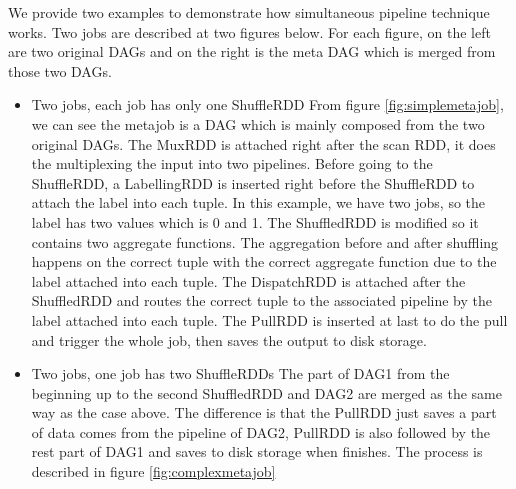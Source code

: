 We provide two examples to demonstrate how simultaneous pipeline technique works. Two jobs are described at two figures below. For each figure, on the left are two original DAGs and on the right is the meta DAG which is merged from those two DAGs.
\begin{itemize}
\item Two jobs, each job has only one ShuffleRDD
From figure \ref{fig:simplemetajob}, we can see the metajob is a DAG which is mainly composed from the two original DAGs. The MuxRDD is attached right after the scan RDD, it does the multiplexing the input into two pipelines. Before going to the ShuffleRDD, a LabellingRDD is inserted right before the ShuffleRDD to attach the label into each tuple. In this example, we have two jobs, so the label has two values which is 0 and 1. The ShuffledRDD is modified so it contains two aggregate functions. The aggregation before and after shuffling happens on the correct tuple with the correct aggregate function due to the label attached into each tuple. The DispatchRDD is attached after the ShuffledRDD and routes the correct tuple to the associated pipeline by the label attached into each tuple. The PullRDD is inserted at last to do the pull and trigger the whole job, then saves the output to disk storage.
\item Two jobs, one job has two ShuffleRDDs
The part of DAG1 from the beginning up to the second ShuffledRDD and DAG2 are merged as the same way as the case above. The difference is that the PullRDD just saves a part of data comes from the pipeline of DAG2, PullRDD is also followed by the rest part of DAG1 and saves to disk storage when finishes. The process is described in figure \ref{fig:complexmetajob}


\end{itemize}
